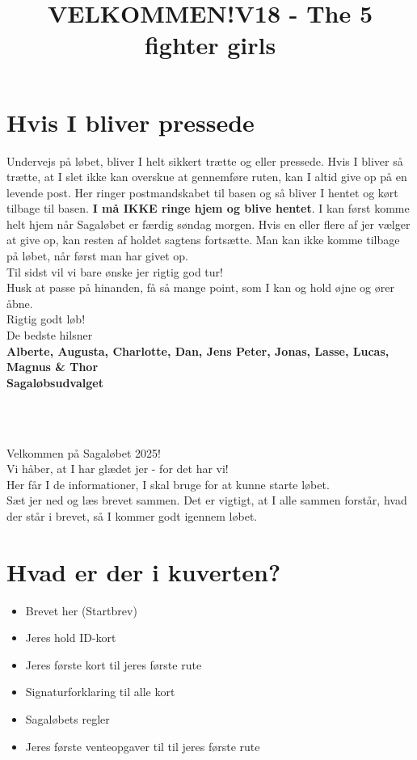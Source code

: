 \section{Hvis I bliver pressede}
Undervejs på løbet, bliver I helt sikkert trætte og eller pressede. Hvis I bliver så trætte, at I slet ikke kan overskue at gennemføre ruten, kan I altid give op på en levende post. Her ringer postmandskabet til basen og så bliver I hentet og kørt tilbage til basen. \textbf{I må IKKE ringe hjem og blive hentet}. I kan først komme helt hjem når Sagaløbet er færdig søndag morgen. Hvis en eller flere af jer vælger at give op, kan resten af holdet sagtens fortsætte. Man kan ikke komme tilbage på løbet, når først man har givet op.\\
\newline
Til sidst vil vi bare ønske jer rigtig god tur!\\
Husk at passe på hinanden, få så mange point, som I kan og hold øjne og ører åbne.\\
\newline
Rigtig godt løb!\\
\newline
\textcolor{søblå}{De bedste hilsner}\\
\textcolor{natblå}{\textbf{Alberte, Augusta, Charlotte, Dan, Jens Peter, Jonas, Lasse, Lucas, Magnus \& Thor}}\\
\textcolor{natblå}{\textbf{Sagaløbsudvalget}}\\
\newpage
\title{VELKOMMEN!}\\
\newline
\title{\textcolor{søblå}{V18 - The 5 fighter girls }}\\
\newline
Velkommen på Sagaløbet 2025!\\
Vi håber, at I har glædet jer - for det har vi!\\
Her får I de informationer, I skal bruge for at kunne starte løbet.\\
Sæt jer ned og læs brevet sammen. Det er vigtigt, at I alle sammen forstår, hvad der står i brevet, så I kommer godt igennem løbet.
\section{Hvad er der i kuverten?}
\begin{itemize}
    \item Brevet her (Startbrev)
    \item Jeres hold ID-kort
    \item Jeres første kort til jeres første rute
    \item Signaturforklaring til alle kort
    \item Sagaløbets regler
    \item Jeres første venteopgaver til til jeres første rute
\end{itemize}
